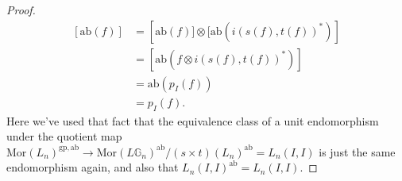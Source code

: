 \documentclass{amsbook} %
\newcommand{\MorLn}{\mathrm{Mor}(L_n)}
\newcommand{\ab}{\mathrm{ab}}
\newcommand{\gp}{\mathrm{gp}}
\numberwithin{section}{chapter}
\begin{document}
\begin{proof}
  \begin{align*}
    \left[\ab(f)\right] &= \left[\ab(f)] \otimes [\ab\left(i(s(f),t(f))^{\ast}\right)\right]\\
    &= \left[\ab\left(f \otimes i(s(f),t(f))^{\ast}\right)\right]\\
    &= \ab\left(p_I(f)\right)\\
    &= p_I(f).
  \end{align*}
Here we've used that fact that the equivalence class of a unit endomorphism under the quotient map $\MorLn^{\gp,\ab} \rightarrow \mathrm{Mor}(L\mathbb{G}_{n})^{\ab}/(s \times t)(L_n)^{\ab} = L_n(I,I)$ is just the same endomorphism again, and also that $L_n(I,I)^{\ab} = L_n(I,I)$. 


\end{proof}
\end{document}
